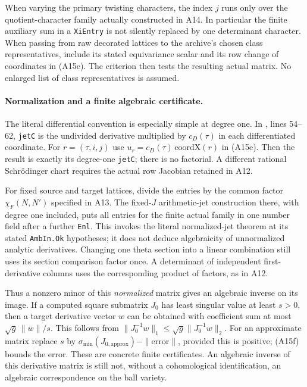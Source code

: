\documentclass[11pt]{article}
\theoremstyle{definition}\newtheorem{definition}[theorem]{Definition}\newtheorem{remark}[theorem]{Remark}
\begin{document}
When varying the primary twisting characters, the index $j$ runs
only over the quotient-character family actually constructed in
A14.  In particular the finite auxiliary sum in a \texttt{XiEntry}
is not silently replaced by one determinant character.  When passing
from raw decorated lattices to the archive's chosen class
representatives, include its stated equivariance scalar and its row
change of coordinates in (A15e).  The criterion then tests the
resulting actual matrix.  No enlarged list of class representatives
is assumed.

\paragraph{Normalization and a finite algebraic certificate.}
The literal differential convention is especially simple at degree
one.  In
,
lines 54--62, \texttt{jetC} is the undivided derivative multiplied by
$c_D(\tau)$ in each differentiated coordinate.  For
$r=(\tau,i,j)$ use
$u_r=c_D(\tau)\,\mathrm{coordX}(r)$ in (A15e).
Then the result is exactly its degree-one \texttt{jetC}; there is
no factorial.  A different rational Schr\"odinger chart requires
the actual row Jacobian retained in A12.

For fixed source and target lattices, divide the entries by the
common factor $\chi_F(N,N')$ specified in A13.  The fixed-$J$
arithmetic-jet construction there, with degree one included, puts
all entries for the finite actual family in one number field after
a further \texttt{Enl}.  This invokes the literal normalized-jet
theorem at its stated \texttt{AmbIn.Ok} hypotheses; it does not
deduce algebraicity of unnormalized analytic derivatives.
Changing one theta section into a linear combination still uses
its section comparison factor once.  A determinant of independent
first-derivative columns uses the corresponding product of factors,
as in A12.

Thus a nonzero minor of this \emph{normalized} matrix gives an
algebraic inverse on its image.  If a computed square submatrix
$J_0$ has least singular value at least $s>0$, then a target
derivative vector $w$ can be obtained with coefficient sum at most
$\sqrt g\,\|w\|/s$.  This follows from
$\|J_0^{-1}w\|_1\leq\sqrt g\|J_0^{-1}w\|_2$.
For an approximate matrix replace $s$ by
$\sigma_{\min}(J_{0,\mathrm{approx}})-\|\mathrm{error}\|$, provided
this is positive; (A15f) bounds the error.
These are concrete finite certificates.  An algebraic inverse of
this derivative matrix is still not, without a cohomological
identification, an algebraic correspondence on the ball variety.
\end{document}
